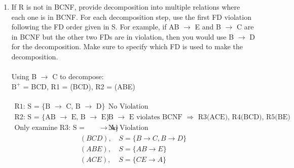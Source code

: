 \documentclass[12pt]{article}
\begin{document}
\begin{enumerate}
\begin{enumerate}
  \item If R is not in BCNF, provide decomposition into multiple relations where each one is in BCNF. For each decomposition step, use the first FD violation following the FD order given in S. For example, if AB $\to$ E and B $\to$ C are in BCNF but the other two FDs are in violation, then you would use B $\to$ D for the decomposition. Make sure to specify which FD is used to make the decomposition. \\ \\
      Using B $\to$ C to decompose: \\
      $\text{B}^+$ = BCD, R1 = (BCD), R2 = (ABE) \\ \\
      \begin{align*}
      \textrm{R1: S = \{B $\to$ C, B $\to$ D\}} & \textrm{ No Violation}\\
      \textrm{R2: S = \{AB $\to$ E, B $\to$ E\}} & \textrm{ B $\to$ E violates BCNF $\Rightarrow$ R3(ACE), R4(BCD), R5(BE) }\\
      \textrm{Only examine R3: S = \{CE $\to$ A\}} & \textrm{ No Violation} 
      \end{align*}
      \begin{align*}
        (BCD)\text{, } & S = \{B\to C, B \to D\} \\
        (ABE)\text{, } & S = \{AB \to E\} \\
        (ACE)\text{, } & S = \{CE \to A\} \\
      \end{align*}
  \end{enumerate}

\newpage


\end{enumerate}
\end{document}
